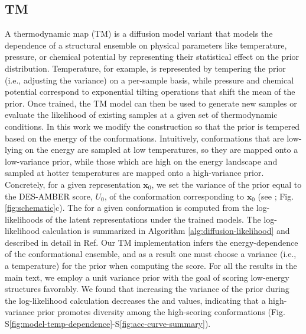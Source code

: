 \documentclass[%
aip,
 amsmath,amssymb,
reprint,%
onecolumn,
]{revtex4-1}
\makeatletter
\newcommand\setcurrentname[1]{\def\@currentlabelname{#1}}
\makeatother
\begin{document}
{%

\subsection*{TM}
\setcurrentname{TM}
\label{methods:thermodynamic-map}

A thermodynamic map (TM) is a diffusion model variant that models the dependence of a structural ensemble on physical parameters like temperature, pressure, or chemical potential by representing their statistical effect on the prior distribution.\cite{herron2024inferring,lee2025exponentially,beyerle2025inferring} Temperature, for example, is represented by tempering the prior (i.e., adjusting the variance) on a per-sample basis, while pressure and chemical potential correspond to exponential tilting operations that shift the mean of the prior.\cite{herron2024inferring,lee2025exponentially} Once trained, the TM model can then be used to generate new samples or evaluate the likelihood of existing samples at a given set of thermodynamic conditions. In this work we modify the construction so that the prior is tempered based on the energy of the conformations. Intuitively, conformations that are low-lying on the energy are sampled at low temperatures, so they are mapped onto a low-variance prior, while those which are high on the energy landscape and sampled at hotter temperatures are mapped onto a high-variance prior. Concretely, for a given representation $\mathbf{x}_0$, we set the variance of the prior equal to the DES-AMBER score, $U_0$, of the conformation corresponding to $\mathbf{x}_0$ (see ; Fig. \ref{fig:schematic}c). The  for a given conformation is computed from the log-likelihoods of the latent representations under the trained models. The log-likelihood calculation is summarized in Algorithm \ref{alg:diffusion-likelihood} and described in detail in Ref.\cite{john2025comparison} Our TM implementation infers the energy-dependence of the conformational ensemble, and as a result one must choose a variance (i.e., a temperature) for the prior when computing the score. For all the results in the main text, we employ a unit variance prior with the goal of scoring low-energy structures favorably. We found that increasing the variance of the prior during the log-likelihood calculation decreases the  and  values, indicating that a high-variance prior promotes diversity among the high-scoring conformations (Fig. S\ref{fig:model-temp-dependence}-S\ref{fig:acc-curve-summary}).

}
\end{document}
